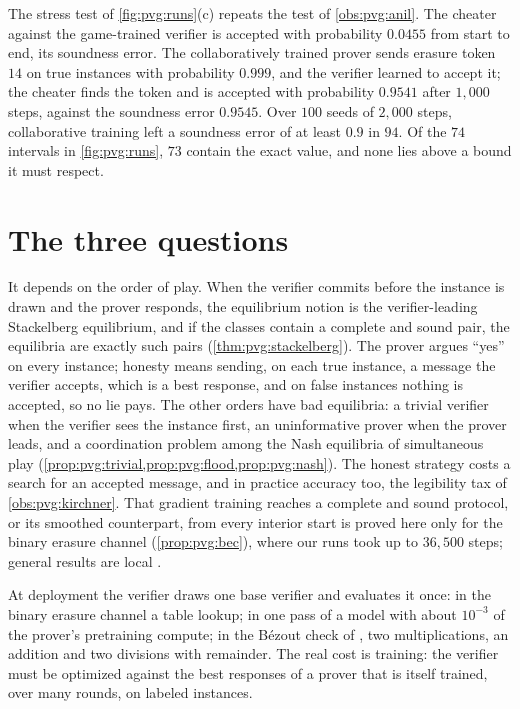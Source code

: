 \begin{refsection}
The stress test of \cref{fig:pvg:runs}(c) repeats the test of \cref{obs:pvg:anil}. The cheater against the game-trained verifier is accepted with probability $0.0455$ from start to end, its soundness error. The collaboratively trained prover sends erasure token $14$ on true instances with probability $0.999$, and the verifier learned to accept it; the cheater finds the token and is accepted with probability $0.9541$ after $1{,}000$ steps, against the soundness error $0.9545$. Over $100$ seeds of $2{,}000$ steps, collaborative training left a soundness error of at least $0.9$ in $94$. Of the $74$ intervals in \cref{fig:pvg:runs}, $73$ contain the exact value, and none lies above a bound it must respect.

\section{The three questions}\label{sec:pvg:questions}

\questionone It depends on the order of play. When the verifier commits before the instance is drawn and the prover responds, the equilibrium notion is the verifier-leading Stackelberg equilibrium, and if the classes contain a complete and sound pair, the equilibria are exactly such pairs (\cref{thm:pvg:stackelberg}). The prover argues ``yes'' on every instance; honesty means sending, on each true instance, a message the verifier accepts, which is a best response, and on false instances nothing is accepted, so no lie pays. The other orders have bad equilibria: a trivial verifier when the verifier sees the instance first, an uninformative prover when the prover leads, and a coordination problem among the Nash equilibria of simultaneous play (\cref{prop:pvg:trivial,prop:pvg:flood,prop:pvg:nash}). The honest strategy costs a search for an accepted message, and in practice accuracy too, the legibility tax of \cref{obs:pvg:kirchner}. That gradient training reaches a complete and sound protocol, or its smoothed counterpart, from every interior start is proved here only for the binary erasure channel (\cref{prop:pvg:bec}), where our runs took up to $36{,}500$ steps; general results are local \parencite{FiezChasnovRatliff2020}.

\questiontwo At deployment the verifier draws one base verifier and evaluates it once: in the binary erasure channel a table lookup; in \textcite{KirchnerEtAl2024} one pass of a model with about $10^{-3}$ of the prover's pretraining compute; in the B\'ezout check of \textcite{AmitEtAl2025}, two multiplications, an addition and two divisions with remainder. The real cost is training: the verifier must be optimized against the best responses of a prover that is itself trained, over many rounds, on labeled instances.


\end{refsection}
